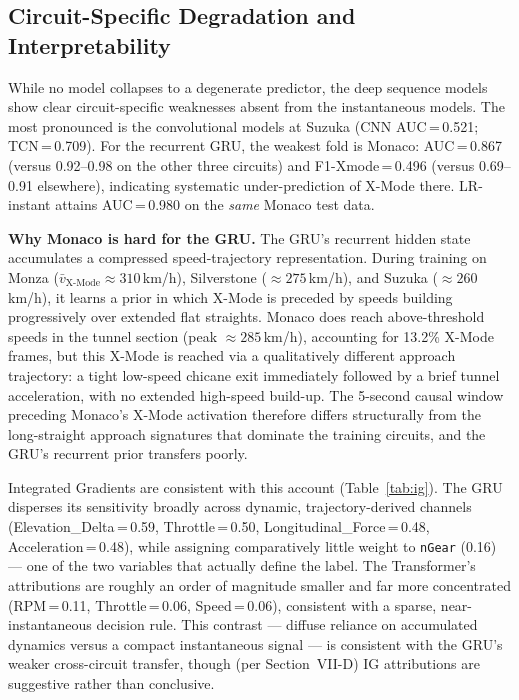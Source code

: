 \documentclass[conference,a4paper]{IEEEtran}
\begin{document}
\subsection{Circuit-Specific Degradation and Interpretability}

While no model collapses to a degenerate predictor, the deep sequence models show clear
circuit-specific weaknesses absent from the instantaneous models. The most pronounced is
the convolutional models at Suzuka (CNN AUC\,=\,0.521; TCN\,=\,0.709). For the recurrent
GRU, the weakest fold is Monaco: AUC\,=\,0.867 (versus 0.92--0.98 on the other three
circuits) and F1-Xmode\,=\,0.496 (versus 0.69--0.91 elsewhere), indicating systematic
under-prediction of X-Mode there. LR-instant attains AUC\,=\,0.980 on the \emph{same}
Monaco test data.

\textbf{Why Monaco is hard for the GRU.}
The GRU's recurrent hidden state accumulates a compressed speed-trajectory
representation. During training on Monza ($\bar{v}_{\text{X-Mode}} \approx 310$\,km/h),
Silverstone ($\approx 275$\,km/h), and Suzuka ($\approx 260$\,km/h), it learns a prior in
which X-Mode is preceded by speeds building progressively over extended flat straights.
Monaco does reach above-threshold speeds in the tunnel section (peak $\approx 285$\,km/h),
accounting for 13.2\% X-Mode frames, but this X-Mode is reached via a qualitatively
different approach trajectory: a tight low-speed chicane exit immediately followed by
a brief tunnel acceleration, with no extended high-speed build-up. The 5-second causal
window preceding Monaco's X-Mode activation therefore differs structurally from the
long-straight approach signatures that dominate the training circuits, and the GRU's
recurrent prior transfers poorly.

Integrated Gradients are consistent with this account (Table~\ref{tab:ig}). The GRU
disperses its sensitivity broadly across dynamic, trajectory-derived channels
(Elevation\_Delta\,=\,0.59, Throttle\,=\,0.50, Longitudinal\_Force\,=\,0.48,
Acceleration\,=\,0.48), while assigning comparatively little weight to \texttt{nGear}
(0.16) — one of the two variables that actually define the label. The Transformer's
attributions are roughly an order of magnitude smaller and far more concentrated
(RPM\,=\,0.11, Throttle\,=\,0.06, Speed\,=\,0.06), consistent with a sparse,
near-instantaneous decision rule. This contrast — diffuse reliance on accumulated dynamics
versus a compact instantaneous signal — is consistent with the GRU's weaker cross-circuit
transfer, though (per Section~VII-D) IG attributions are suggestive rather than conclusive.
\end{document}
